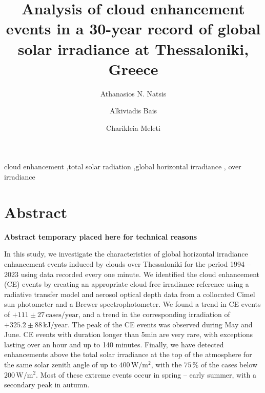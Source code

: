 \documentclass[preprint, 5p,
authoryear]{elsarticle} %
\begin{document}
\begin{frontmatter}

  \title{Analysis of cloud enhancement events in a 30-year record of
global solar irradiance at Thessaloniki, Greece}
    \author[LAP]{Athanasios N. Natsis%
  }
    \author[LAP]{Alkiviadis Bais%
  }
    \author[LAP]{Charikleia Meleti%
  }
  
  \begin{abstract}
  
  \end{abstract}
    \begin{keyword}
    cloud enhancement \sep total solar radiation \sep global horizontal
irradiance \sep 
    over irradiance
  \end{keyword}
  
 \end{frontmatter}

\hypertarget{abstract}{%
\section*{Abstract}\label{abstract}}

\textbf{Abstract temporary placed here for technical reasons}

In this study, we investigate the characteristics of global horizontal
irradiance enhancement events induced by clouds over Thessaloniki for
the period 1994 -- 2023 using data recorded every one minute. We
identified the cloud enhancement (CE) events by creating an appropriate
cloud-free irradiance reference using a radiative transfer model and
aerosol optical depth data from a collocated Cimel sun photometer and a
Brewer spectrophotometer. We found a trend in CE events of
\(+111\pm 27\,\text{cases}/\text{year}\), and a trend in the
corresponding irradiation of \(+325.2\pm 88\,\text{kJ}/\text{year}\).
The peak of the CE events was observed during May and June. CE events
with duration longer than 5\nobreakspace{}min are very rare, with
exceptions lasting over an hour and up to 140 minutes. Finally, we have
detected enhancements above the total solar irradiance at the top of the
atmosphere for the same solar zenith angle of up to
\(400\,\text{W}/\text{m}^{2}\), with the \(75\,\%\) of the cases below
\(200\,\text{W}/\text{m}^{2}\). Most of these extreme events occur in
spring -- early summer, with a secondary peak in autumn.
\end{document}
